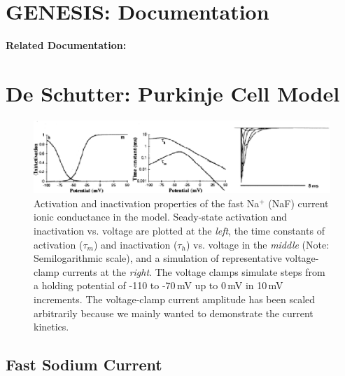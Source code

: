 \documentclass[12pt]{article}
\begin{document}
\section*{GENESIS: Documentation}

{\bf Related Documentation:}

\section*{De Schutter: Purkinje Cell Model}

\begin{figure}[h]
\centering
   \includegraphics[scale=0.75]{figures/DS1.2Af.eps}
   \caption{Activation and inactivation properties of the fast Na$^+$ (NaF) current ionic conductance in the model. Seady-state activation and inactivation vs. voltage are plotted at the {\em left}, the time constants of activation ($\tau_m$) and inactivation ($\tau_h$) vs. voltage in the {\em middle} (Note: Semilogarithmic scale), and a simulation of representative voltage-clamp currents at the {\em right}. The voltage clamps simulate steps from a holding potential of -110 to -70\,mV up to 0\,mV in 10\,mV increments. The voltage-clamp current amplitude has been scaled arbitrarily because we mainly wanted to demonstrate the current kinetics.}
   \label{fig:DS1.2A}
\end{figure}

\subsection*{Fast Sodium Current}
\end{document}
